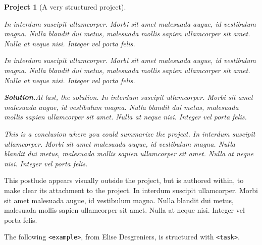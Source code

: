 \documentclass[pdflatex]{sn-jnl}
\theoremstyle{thmstyleone}%
\theoremstyle{thmstyletwo}%
\newtheorem{project}[theorem]{Project}
\theoremstyle{thmstylethree}%
\newcommand{\blocktitlefont}{\relax}
\newcommand{\mono}[1]{\texttt{#1}}
\numberwithin{equation}{section}
\begin{document}
\begin{project}[A very structured project]
\begin{enumerate}[font=\bfseries,label=(\alph*),ref=\alph*]
\par
In interdum suscipit ullamcorper. Morbi sit amet malesuada augue, id vestibulum magna. Nulla blandit dui metus, malesuada mollis sapien ullamcorper sit amet. Nulla at neque nisi. Integer vel porta felis.%
\par
In interdum suscipit ullamcorper. Morbi sit amet malesuada augue, id vestibulum magna. Nulla blandit dui metus, malesuada mollis sapien ullamcorper sit amet. Nulla at neque nisi. Integer vel porta felis.%
\par\smallskip%
\noindent\textbf{\blocktitlefont Solution}.\hypertarget{project-structured-7-5}{}\quad{}At last, the solution.  In interdum suscipit ullamcorper. Morbi sit amet malesuada augue, id vestibulum magna. Nulla blandit dui metus, malesuada mollis sapien ullamcorper sit amet. Nulla at neque nisi. Integer vel porta felis.%
\end{enumerate}%
This is a conclusion where you could summarize the project.  In interdum suscipit ullamcorper. Morbi sit amet malesuada augue, id vestibulum magna. Nulla blandit dui metus, malesuada mollis sapien ullamcorper sit amet. Nulla at neque nisi. Integer vel porta felis.%
\end{project}%
\par
This postlude appears visually outside the project, but is authored within, to make clear its attachment to the project.  In interdum suscipit ullamcorper. Morbi sit amet malesuada augue, id vestibulum magna. Nulla blandit dui metus, malesuada mollis sapien ullamcorper sit amet. Nulla at neque nisi. Integer vel porta felis.%
\par
The following \mono{<example>}, from Elise Desgreniers, is structured with \mono{<task>}.%
\end{document}
